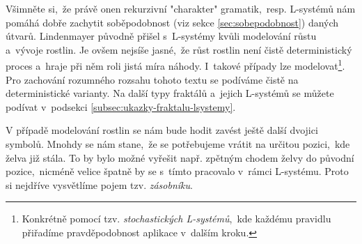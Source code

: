 Všimněte si,~že právě onen rekurzivní "charakter" gramatik,~resp. L-systémů nám pomáhá dobře zachytit soběpodobnost (viz sekce \ref{sec:sobepodobnost}) daných útvarů. Lindenmayer původně přišel s~L-systémy kvůli modelování růstu a~vývoje rostlin. Je ovšem nejsíše jasné,~že růst rostlin není čistě deterministický proces a~hraje při něm roli jistá míra náhody. \cite{Prusinkiewicz1990} I~takové případy lze modelovat\footnote{Konkrétně pomocí tzv. \emph{stochastických L-systémů},~kde každému pravidlu přiřadíme pravděpodobnost aplikace v~dalším kroku.}. Pro zachování rozumného rozsahu tohoto textu se podíváme čistě na deterministické varianty. Na další typy fraktálů a~jejich L-systémů se můžete podívat v~podsekci \ref{subsec:ukazky-fraktalu-lsystemy}.

V případě modelování rostlin se nám bude hodit zavést ještě další dvojici symbolů. Mnohdy se nám stane,~že se potřebujeme vrátit na určitou pozici,~kde želva již stála. To by bylo možné vyřešit např. zpětným chodem želvy do původní pozice,~nicméně velice špatně by se s~tímto pracovalo v~rámci L-systému. Proto si nejdříve vysvětlíme pojem tzv. \emph{zásobníku}.

